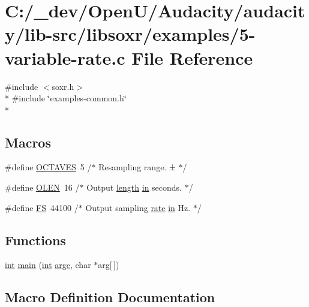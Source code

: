 \hypertarget{5-variable-rate_8c}{}\section{C\+:/\+\_\+dev/\+Open\+U/\+Audacity/audacity/lib-\/src/libsoxr/examples/5-\/variable-\/rate.c File Reference}
\label{5-variable-rate_8c}
{\ttfamily \#include $<$soxr.\+h$>$}\\*
{\ttfamily \#include \char`\"{}examples-\/common.\+h\char`\"{}}\\*
\subsection*{Macros}
\begin{DoxyCompactItemize}
\item 
\#define \hyperlink{5-variable-rate_8c_a2f1a464b785fb757fb83015c59c2039f}{O\+C\+T\+A\+V\+ES}~5       /$\ast$ Resampling range. ± $\ast$/
\item 
\#define \hyperlink{5-variable-rate_8c_aedaf7a8b96480273cd1724075de06c31}{O\+L\+EN}~16      /$\ast$ Output \hyperlink{test__lib_f_l_a_c_2format_8c_ac94dc16b22556ba5fa815655f27442da}{length} \hyperlink{latency_8c_a7d946209d777cb95fe30364b8d321207}{in} seconds. $\ast$/
\item 
\#define \hyperlink{5-variable-rate_8c_a30588c5eca7c9cb6ebba02a0236f0119}{FS}~44100   /$\ast$ Output sampling \hyperlink{seqread_8c_ad89d3fac2deab7a9cf6cfc8d15341b85}{rate} \hyperlink{latency_8c_a7d946209d777cb95fe30364b8d321207}{in} Hz. $\ast$/
\end{DoxyCompactItemize}
\subsection*{Functions}
\begin{DoxyCompactItemize}
\item 
\hyperlink{xmltok_8h_a5a0d4a5641ce434f1d23533f2b2e6653}{int} \hyperlink{5-variable-rate_8c_ad338a7dbc41dc40bcecd0479377ef207}{main} (\hyperlink{xmltok_8h_a5a0d4a5641ce434f1d23533f2b2e6653}{int} \hyperlink{cmdline_8c_aaffeb1bf2056ea44af5b5d0ee4d6ff07}{argc}, char $\ast$arg\mbox{[}$\,$\mbox{]})
\end{DoxyCompactItemize}


\subsection{Macro Definition Documentation}
